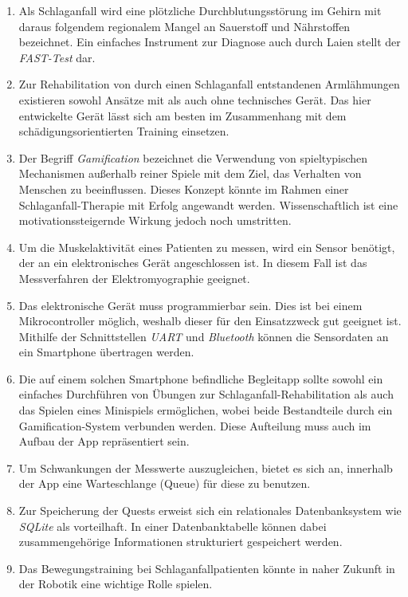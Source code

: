 \documentclass[a4paper, 12pt]{scrartcl}
\begin{document}
\begin{enumerate}
	\item Als Schlaganfall wird eine plötzliche Durchblutungsstörung im Gehirn mit daraus folgendem regionalem Mangel an Sauerstoff und Nährstoffen bezeichnet. Ein einfaches Instrument zur Diagnose auch durch Laien stellt der \emph{FAST-Test} dar.
	\item Zur Rehabilitation von durch einen Schlaganfall entstandenen Armlähmungen existieren sowohl Ansätze mit als auch ohne technisches Gerät. Das hier entwickelte Gerät lässt sich am besten im Zusammenhang mit dem schädigungsorientierten Training einsetzen.
	\item Der Begriff \emph{Gamification} bezeichnet die Verwendung von spieltypischen Mechanismen außerhalb reiner Spiele mit dem Ziel, das Verhalten von Menschen zu beeinflussen. Dieses Konzept könnte im Rahmen einer Schlaganfall-Therapie mit Erfolg angewandt werden. Wissenschaftlich ist eine motivationssteigernde Wirkung jedoch noch umstritten.
	\item Um die Muskelaktivität eines Patienten zu messen, wird ein Sensor benötigt, der an ein elektronisches Gerät angeschlossen ist. In diesem Fall ist das Messverfahren der Elektromyographie geeignet.
	\item Das elektronische Gerät muss programmierbar sein. Dies ist bei einem Mikrocontroller möglich, weshalb dieser für den Einsatzzweck gut geeignet ist. Mithilfe der Schnittstellen \emph{UART} und \emph{Bluetooth} können die Sensordaten an ein Smartphone übertragen werden.
	\item Die auf einem solchen Smartphone befindliche Begleitapp sollte sowohl ein einfaches Durchführen von Übungen zur Schlaganfall-Rehabilitation als auch das Spielen eines Minispiels ermöglichen, wobei beide Bestandteile durch ein Gamification-System verbunden werden. Diese Aufteilung muss auch im Aufbau der App repräsentiert sein.
	\item Um Schwankungen der Messwerte auszugleichen, bietet es sich an, innerhalb der App eine Warteschlange (Queue) für diese zu benutzen.
	\item Zur Speicherung der Quests erweist sich ein relationales Datenbanksystem wie \emph{SQLite} als vorteilhaft. In einer Datenbanktabelle können dabei zusammengehörige Informationen strukturiert gespeichert werden.
	\item Das Bewegungstraining bei Schlaganfallpatienten könnte in naher Zukunft in der Robotik eine wichtige Rolle spielen.
\end{enumerate}
\end{document}
